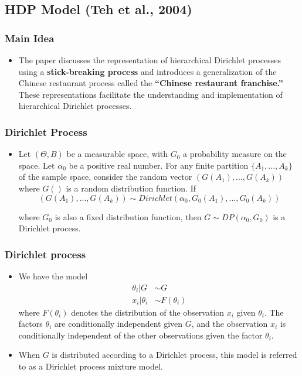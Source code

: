 \documentclass{beamer}
\begin{document}
\subsection{\small{HDP Model (Teh et al., 2004)}}
\begin{frame}
    \frametitle{Main Idea}
    \begin{itemize}
        \item The paper discusses the representation of hierarchical Dirichlet processes using a \textbf{stick-breaking process} and introduces a generalization of the Chinese restaurant process called the \textbf{“Chinese restaurant franchise.”} These representations facilitate the understanding and implementation of hierarchical Dirichlet processes.
    \end{itemize}
\end{frame}
\begin{frame}
    \frametitle{Dirichlet Process}
    \begin{itemize}
        \item Let $(\Theta, B)$ be a measurable space, with $G_0$ a probability measure on the space. Let $\alpha_0$ be a positive real number. For any finite partition $\{A_1,...,A_k\}$ of the sample space, consider the random vector $(G(A_1),...,G(A_k))$ where $G()$ is a random distribution function. If
$$(G(A_1),...,G(A_k))\sim Dirichlet(\alpha_0, G_0(A_1),...,G_0(A_k))$$

where $G_0$ is also a fixed distribution function, then $G \sim DP(\alpha_0,G_0)$ is a Dirichlet process.
    \end{itemize}
\end{frame}
\begin{frame}
    \frametitle{Dirichlet process}
    \begin{itemize}
        \item We have the model
$$\begin{aligned}\theta_{i}|G &\sim G\\
x_{i}|\theta_{i}&\sim F(\theta_{i})\end{aligned}$$
where $F(\theta_{i})$ denotes the distribution of the observation $x_i$ given $\theta_{i}$. The factors $\theta_{i}$ are conditionally independent given $G$, and the observation $x_i$ is conditionally independent of the other observations given the factor $\theta_{i}$. 
    \item When $G$ is distributed according to a Dirichlet process, this model is referred to as a Dirichlet process mixture model.
    \end{itemize}
\end{frame}
\end{document}
